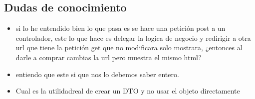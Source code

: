 \subsection*{Dudas de conocimiento}
\begin{itemize}
    \item si lo he entendido bien lo que pasa es se hace una petición post a un controlador, este lo que hace es delegar la logica de negocio y redirigir a otra url que tiene la petición get que no modificara solo mostrara, ¿entonces al darle a comprar cambias la url pero muestra el mismo html?
    \item entiendo que este si que nos lo debemos saber entero. 
    \item Cual es la utilidadreal de crear un DTO y no usar el objeto directamente
\end{itemize}
